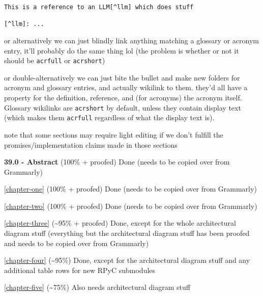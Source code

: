 \begin{lstlisting}
This is a reference to an LLM[^llm] which does stuff

[^llm]: ...
\end{lstlisting}

or alternatively we can just blindly link anything matching a glossary
or acronym entry, it'll probably do the same thing lol (the problem is
whether or not it should be \passthrough{\lstinline!acrfull!} or
\passthrough{\lstinline!acrshort!})

or double-alternatively we can just bite the bullet and make new folders
for acronym and glossary entries, and actually wikilink to them. they'd
all have a property for the definition, reference, and (for acronyms)
the acronym itself. Glossary wikilinks are
\passthrough{\lstinline!acrshort!} by default, unless they contain
display text (which makes them \passthrough{\lstinline!acrfull!}
regardless of what the display text is).

note that some sections may require light editing if we don't fulfill
the promises/implementation claims made in those sections

\textbf{39.0 - Abstract} (100\% + proofed) Done (needs to be copied over
from Grammarly)

\autoref{chapter-one} (100\% + proofed) Done (needs to be copied
over from Grammarly)

\autoref{chapter-two} (100\% + proofed) Done (needs to be
copied over from Grammarly)

\autoref{chapter-three} (\textasciitilde95\% + proofed)
Done, except for the whole architectural diagram stuff (everything but
the architectural diagram stuff has been proofed and needs to be copied
over from Grammarly)

\autoref{chapter-four} (\textasciitilde95\%) Done, except for
the architectural diagram stuff and any additional table rows for new
RPyC submodules

\autoref{chapter-five} (\textasciitilde75\%) Also needs
architectural diagram stuff

